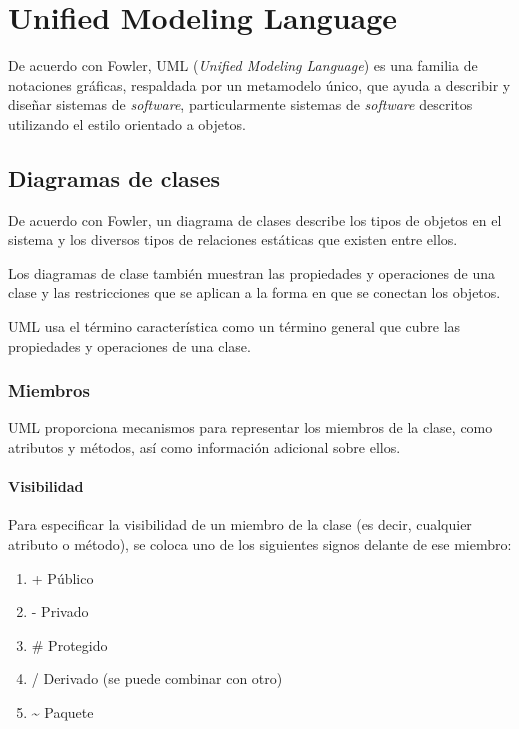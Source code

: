 \section{Unified Modeling Language}

De acuerdo con Fowler\cite{fowler_brief_2003}, UML (\textit{Unified Modeling Language}) es una familia de notaciones gráficas, respaldada por un metamodelo único, que ayuda a describir y diseñar sistemas de \textit{software}, particularmente sistemas de \textit{software} descritos utilizando el estilo orientado a objetos.

\subsection{Diagramas de clases}

De acuerdo con Fowler\cite{fowler_brief_2003}, un diagrama de clases describe los tipos de objetos en el sistema y los diversos tipos de relaciones estáticas que existen entre ellos. 


Los diagramas de clase también muestran las propiedades y operaciones de una clase y las restricciones que se aplican a la forma en que se conectan los objetos.


UML usa el término característica como un término general que cubre las propiedades y operaciones de una clase.


\subsubsection*{Miembros}
UML proporciona mecanismos para representar los miembros de la clase, como atributos y métodos, así como información adicional sobre ellos.


\paragraph*{Visibilidad}
Para especificar la visibilidad de un miembro de la clase (es decir, cualquier atributo o método), se coloca uno de los siguientes signos delante de ese miembro:

\begin{enumerate}
    \item +	Público
    \item -	Privado
    \item \# Protegido
    \item /	Derivado (se puede combinar con otro)
    \item \~ \;	Paquete
\end{enumerate}

